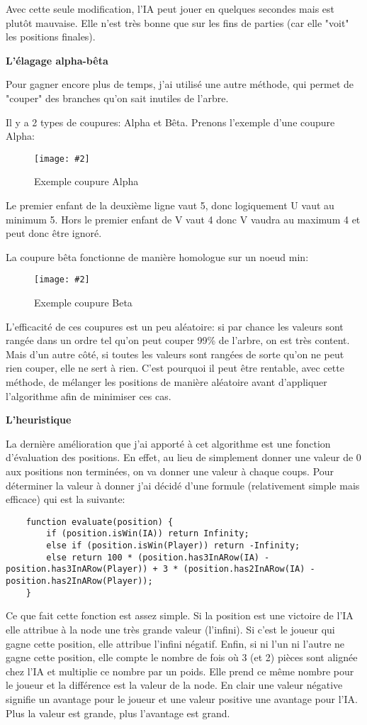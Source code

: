 \documentclass[a4paper]{article}
\newcommand{\img}[3][]{
    \begin{figure}[H]
        \centering
        \texttt{[image: \#2]}
        \caption{#1}    
    \end{figure}
}
\newcommand{\ptitle}[1]{\vspace{10pt}
{\large \noindent \textbf{#1}}}
\begin{document}
    Avec cette seule modification, l'IA peut jouer en quelques secondes mais est plutôt mauvaise. Elle n'est très bonne que sur les fins de parties (car elle "voit" les positions finales).

    \ptitle{L'élagage alpha-bêta}

    Pour gagner encore plus de temps, j'ai utilisé une autre méthode, qui permet de "couper" des branches qu'on sait inutiles de l'arbre.

    Il y a 2 types de coupures: Alpha et Bêta. Prenons l'exemple d'une coupure Alpha: 

    \img[Exemple coupure Alpha]{Images/AlphaCutDemo.png}{0.3}

    Le premier enfant de la deuxième ligne vaut 5, donc logiquement U vaut au minimum 5. Hors le premier enfant de V vaut 4 donc V vaudra au maximum 4 et peut donc être ignoré.

    La coupure bêta fonctionne de manière homologue sur un noeud min: 
    \img[Exemple coupure Beta]{Images/BetaCutDemo.png}{0.3}

    L'efficacité de ces coupures est un peu aléatoire: si par chance les valeurs sont rangée dans un ordre tel qu'on peut couper 99\% de l'arbre, on est très content. Mais d'un autre côté, si toutes les valeurs sont rangées de sorte qu'on ne peut rien couper, elle ne sert à rien. C'est pourquoi il peut être rentable, avec cette méthode, de mélanger les positions de manière aléatoire avant d'appliquer l'algorithme afin de minimiser ces cas.

    \ptitle{L'heuristique}

    La dernière amélioration que j'ai apporté à cet algorithme est une fonction d'évaluation des positions. En effet, au lieu de simplement donner une valeur de 0 aux positions non terminées, on va donner une valeur à chaque coups. Pour déterminer la valeur à donner j'ai décidé d'une formule (relativement simple mais efficace) qui est la suivante: 
    \begin{lstlisting}
    function evaluate(position) {
        if (position.isWin(IA)) return Infinity;
        else if (position.isWin(Player)) return -Infinity;
        else return 100 * (position.has3InARow(IA) - position.has3InARow(Player)) + 3 * (position.has2InARow(IA) - position.has2InARow(Player));
    }
    \end{lstlisting}
    Ce que fait cette fonction est assez simple. Si la position est une victoire de l'IA elle attribue à la node une très grande valeur (l'infini). Si c'est le joueur qui gagne cette position, elle attribue l'infini négatif. Enfin, si ni l'un ni l'autre ne gagne cette position, elle compte le nombre de fois où 3 (et 2) pièces sont alignée chez l'IA et multiplie ce nombre par un poids. Elle prend ce même nombre pour le joueur et la différence est la valeur de la node. En clair une valeur négative signifie un avantage pour le joueur et une valeur positive une avantage pour l'IA. Plus la valeur est grande, plus l'avantage est grand.
\end{document}
